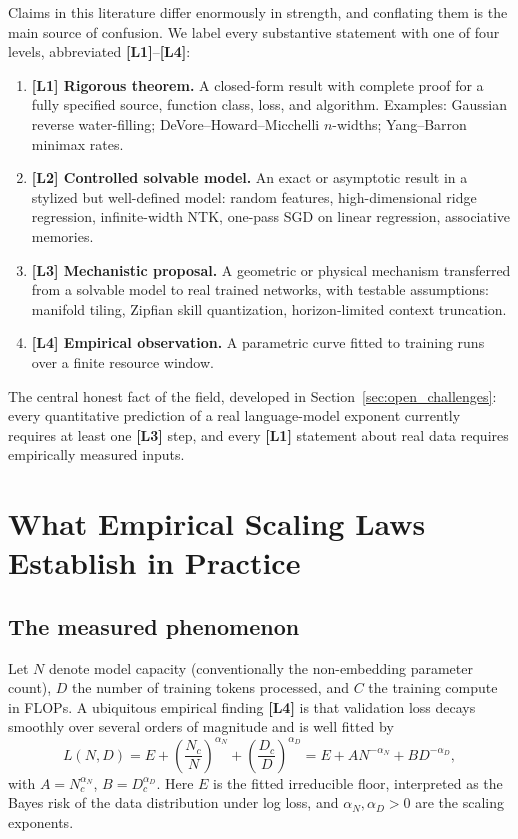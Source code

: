 \documentclass[11pt,a4paper]{article}
\theoremstyle{definition}
\begin{document}
Claims in this literature differ enormously in strength, and conflating them is the main source of confusion. We label every substantive statement with one of four levels, abbreviated \textbf{[L1]}--\textbf{[L4]}:

\begin{enumerate}[leftmargin=2.0em]
  \item \textbf{[L1] Rigorous theorem.} A closed-form result with complete proof for a fully specified source, function class, loss, and algorithm. Examples: Gaussian reverse water-filling; DeVore--Howard--Micchelli $n$-widths; Yang--Barron minimax rates.
  \item \textbf{[L2] Controlled solvable model.} An exact or asymptotic result in a stylized but well-defined model: random features, high-dimensional ridge regression, infinite-width NTK, one-pass SGD on linear regression, associative memories.
  \item \textbf{[L3] Mechanistic proposal.} A geometric or physical mechanism transferred from a solvable model to real trained networks, with testable assumptions: manifold tiling, Zipfian skill quantization, horizon-limited context truncation.
  \item \textbf{[L4] Empirical observation.} A parametric curve fitted to training runs over a finite resource window.
\end{enumerate}

The central honest fact of the field, developed in Section~\ref{sec:open_challenges}: every quantitative prediction of a real language-model exponent currently requires at least one \textbf{[L3]} step, and every \textbf{[L1]} statement about real data requires empirically measured inputs.

\section{What Empirical Scaling Laws Establish in Practice}
\label{sec:empirical_laws}

\subsection{The measured phenomenon}

Let $N$ denote model capacity (conventionally the non-embedding parameter count), $D$ the number of training tokens processed, and $C$ the training compute in FLOPs. A ubiquitous empirical finding \textbf{[L4]} is that validation loss decays smoothly over several orders of magnitude and is well fitted by
\begin{equation}
  L(N,D) = E + \left(\frac{N_c}{N}\right)^{\alpha_N} + \left(\frac{D_c}{D}\right)^{\alpha_D} = E + A N^{-\alpha_N} + B D^{-\alpha_D},
  \label{eq:additive-fit}
\end{equation}
with $A = N_c^{\alpha_N}$, $B = D_c^{\alpha_D}$. Here $E$ is the fitted irreducible floor, interpreted as the Bayes risk of the data distribution under log loss, and $\alpha_N,\alpha_D>0$ are the scaling exponents.
\end{document}
